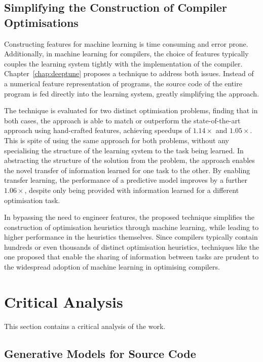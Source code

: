 

\subsection{Simplifying the Construction of Compiler Optimisations}

Constructing features for machine learning is time consuming and error prone. Additionally, in machine learning for compilers, the choice of features typically couples the learning system tightly with the implementation of the compiler. Chapter~\ref{chap:deeptune} proposes a technique to address both issues. Instead of a numerical feature representation of programs, the source code of the entire program is fed directly into the learning system, greatly simplifying the approach.

The technique is evaluated for two distinct optimisation problems, finding that in both cases, the approach is able to match or outperform the state-of-the-art approach using hand-crafted features, achieving speedups of $1.14\times$ and $1.05\times$. This is spite of using the same approach for both problems, without any specialising the structure of the learning system to the task being learned. In abstracting the structure of the solution from the problem, the approach enables the novel transfer of information learned for one task to the other. By enabling transfer learning, the performance of a predictive model improves by a further $1.06\times$, despite only being provided with information learned for a different optimisation task.

In bypassing the need to engineer features, the proposed technique simplifies the construction of optimisation heuristics through machine learning, while leading to higher performance in the heuristics themselves. Since compilers typically contain hundreds or even thousands of distinct optimisation heuristics, techniques like the one proposed that enable the sharing of information between tasks are prudent to the widespread adoption of machine learning in optimising compilers.


\section{Critical Analysis}
\label{sec:conclusions-critical-analysis}

This section contains a critical analysis of the work.


\subsection{Generative Models for Source Code}

